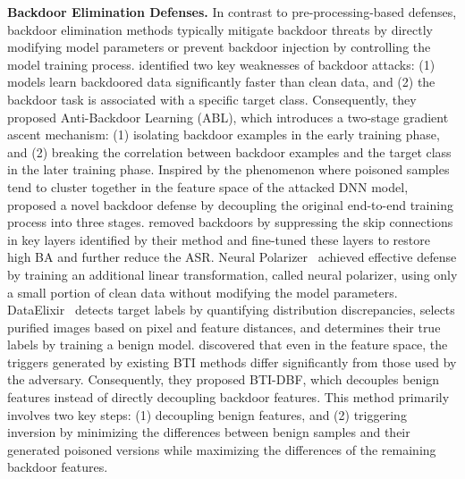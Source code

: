 \textbf{Backdoor Elimination Defenses.}
In contrast to pre-processing-based defenses, backdoor elimination methods typically mitigate backdoor threats by directly modifying model parameters or prevent backdoor injection by controlling the model training process. \cite{li2021anti} identified two key weaknesses of backdoor attacks: (1) models learn backdoored data significantly faster than clean data, and (2) the backdoor task is associated with a specific target class. Consequently, they proposed Anti-Backdoor Learning (ABL), which introduces a two-stage gradient ascent mechanism: (1) isolating backdoor examples in the early training phase, and (2) breaking the correlation between backdoor examples and the target class in the later training phase. Inspired by the phenomenon where poisoned samples tend to cluster together in the feature space of the attacked DNN model, \cite{huang2022backdoor} proposed a novel backdoor defense by decoupling the original end-to-end training process into three stages. \cite{yang2023backdoor} removed backdoors by suppressing the skip connections in key layers identified by their method and fine-tuned these layers to restore high BA and further reduce the ASR. Neural Polarizer~\citep{zhu2023neural} achieved effective defense by training an additional linear transformation, called neural polarizer, using only a small portion of clean data without modifying the model parameters. DataElixir~\citep{zhou2024dataelixir} detects target labels by quantifying distribution discrepancies, selects purified images based on pixel and feature distances, and determines their true labels by training a benign model. \citet{xu2024towards} discovered that even in the feature space, the triggers generated by existing BTI methods differ significantly from those used by the adversary. Consequently, they proposed BTI-DBF, which decouples benign features instead of directly decoupling backdoor features. This method primarily involves two key steps: (1) decoupling benign features, and (2) triggering inversion by minimizing the differences between benign samples and their generated poisoned versions while maximizing the differences of the remaining backdoor features.



